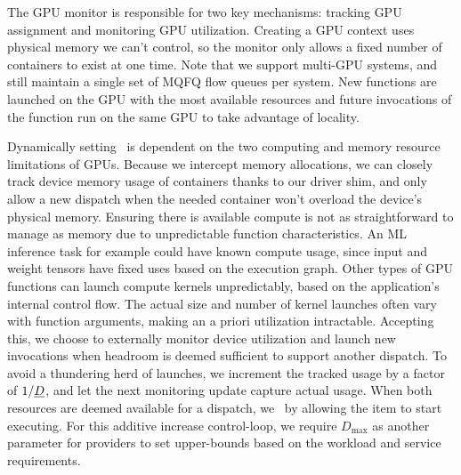 The GPU monitor is responsible for two key mechanisms: tracking GPU assignment and monitoring GPU utilization.
Creating a GPU context uses physical memory we can't control, so the monitor only allows a fixed number of containers to exist at one time.
Note that we support multi-GPU systems, and still maintain a single set of MQFQ flow queues per system.  
New functions are launched on the GPU with the most available resources and future invocations of the function run on the same GPU to take advantage of locality. 

Dynamically setting \D~is dependent on the two computing and memory resource limitations of GPUs. 
Because we intercept memory allocations, we can closely track device memory usage of containers thanks to our driver shim, and only allow a new dispatch when the needed container won't overload the device's physical memory. 
Ensuring there is available compute is not as straightforward to manage as memory due to unpredictable function characteristics.
An ML inference task for example could have known compute usage, since input and weight tensors have fixed uses based on the execution graph.
Other types of GPU functions can launch compute kernels unpredictably, based on the application's internal control flow.
The actual size and number of kernel launches often vary with function arguments, making an a priori utilization intractable.
Accepting this, we choose to externally monitor device utilization and launch new invocations when headroom is deemed sufficient to support another dispatch.
To avoid a thundering herd of launches, we increment the tracked usage by a factor of $1/\emph{D}$, and let the next monitoring update capture actual usage.
When both resources are deemed available for a dispatch, we  \D~by allowing the item to start executing.
For this additive increase control-loop, we require $D_{\text{max}}$ as another parameter for providers to set upper-bounds based on the workload and service requirements.




